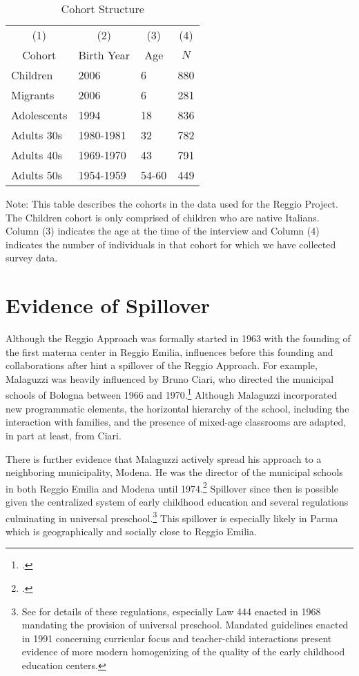 \documentclass[12pt]{article}
\begin{document}
\begin{table}[htbp]
\small
\begin{center}
\caption{Cohort Structure}\label{tab:cohorts}
\begin{tabular}{l l l l}
\toprule
\multicolumn{1}{c}{(1)} & \multicolumn{1}{c}{(2)} & \multicolumn{1}{c}{(3)} & \multicolumn{1}{c}{(4)} \\
\multicolumn{1}{c}{Cohort} & \multicolumn{1}{c}{Birth Year} & \multicolumn{1}{c}{Age} & \multicolumn{1}{c}{$N$} \\
\midrule
Children & 2006 & 6 & 880 \\
Migrants & 2006 & 6 & 281 \\
Adolescents & 1994 & 18 & 836 \\
Adults 30s & 1980-1981 & 32 & 782 \\
Adults 40s & 1969-1970  & 43 & 791 \\
Adults 50s & 1954-1959 & 54-60 & 449 \\
\bottomrule
\end{tabular}
\end{center}
\footnotesize \raggedright
Note: This table describes the cohorts in the data used for the Reggio Project. The Children cohort is only comprised of children who are native Italians. Column (3) indicates the age at the time of the interview and Column (4) indicates the number of individuals in that cohort for which we have collected survey data.
\end{table}

\section*{Evidence of Spillover}
Although the Reggio Approach was formally started in 1963 with the founding of the first materna center in Reggio Emilia, influences before this founding and collaborations after hint a spillover of the Reggio Approach. For example, Malaguzzi was heavily influenced by Bruno Ciari, who directed the municipal schools of Bologna between 1966 and 1970.\footnote{\citet{forman1998hundred}.} Although Malaguzzi incorporated new programmatic elements, the horizontal hierarchy of the school, including the interaction with families, and the presence of mixed-age classrooms are adapted, in part at least, from Ciari.

There is further evidence that Malaguzzi actively spread his approach to a neighboring municipality, Modena. He was the director of the municipal schools in both Reggio Emilia and Modena until 1974.\footnote{\citet{Cagliari-etal-eds_2016_BOOK_Loris-Malaguzzi}.} Spillover since then is possible given the centralized system of early childhood education and several regulations culminating in universal preschool.\footnote{See \citet{della2001early} for details of these regulations, especially Law 444 enacted in 1968 mandating the provision of universal preschool. Mandated guidelines enacted in 1991 concerning curricular focus and teacher-child interactions present evidence of more modern homogenizing of the quality of the early childhood education centers.} This spillover is especially likely in Parma which is geographically and socially close to Reggio Emilia.
\end{document}
